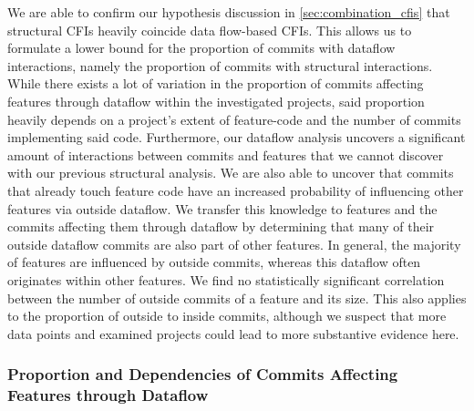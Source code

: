 We are able to confirm our hypothesis discussion in \autoref{sec:combination_cfis} that structural CFIs heavily coincide data flow-based CFIs.
This allows us to formulate a lower bound for the proportion of commits with dataflow interactions, namely the proportion of commits with structural interactions.
While there exists a lot of variation in the proportion of commits affecting features through dataflow within the investigated projects, said proportion heavily depends on a project's extent of feature-code and the number of commits implementing said code.
Furthermore, our dataflow analysis uncovers a significant amount of interactions between commits and features that we cannot discover with our previous structural analysis.
We are also able to uncover that commits that already touch feature code have an increased probability of influencing other features via outside dataflow.
We transfer this knowledge to features and the commits affecting them through dataflow by determining that many of their outside dataflow commits are also part of other features.
In general, the majority of features are influenced by outside commits, whereas this dataflow often originates within other features.
We find no statistically significant correlation between the number of outside commits of a feature and its size.
This also applies to the proportion of outside to inside commits, although we suspect that more data points and examined projects could lead to more substantive evidence here.

\subsubsection*{Proportion and Dependencies of Commits Affecting Features through Dataflow}

